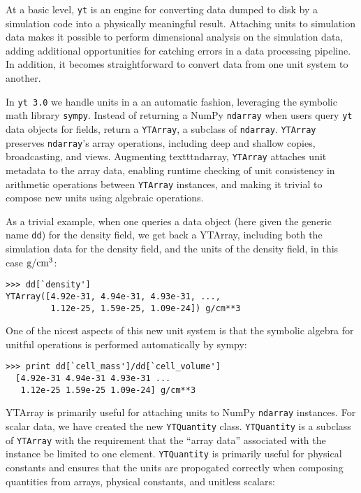 At a basic level, \texttt{yt} is an engine for converting data dumped to disk
by a simulation code into a physically meaningful result.  Attaching units to
simulation data makes it possible to perform dimensional analysis on the
simulation data, adding additional opportunities for catching errors in a data
processing pipeline.  In addition, it becomes straightforward to convert data
from one unit system to another.

In \texttt{yt 3.0} we handle units in a an automatic fashion, leveraging the
symbolic math library \texttt{sympy}. Instead of returning a NumPy
\texttt{ndarray} when users query \texttt{yt} data objects for fields, return a
\texttt{YTArray}, a subclass of \texttt{ndarray}. \texttt{YTArray} preserves
\texttt{ndarray}'s array operations, including deep and shallow copies,
broadcasting, and views.  Augmenting texttt{ndarray}, \texttt{YTArray} attaches
unit metadata to the array data, enabling runtime checking of unit consistency
in arithmetic operations between \texttt{YTArray} instances, and making it
trivial to compose new units using algebraic operations.

As a trivial example, when one queries a data object (here given the generic
name \texttt{dd}) for the density field, we get back a YTArray, including both
the simulation data for the density field, and the units of the density field,
in this case $\rm{g}/\rm{cm}^3$:

\begin{Verbatim}
>>> dd[`density'] 
YTArray([4.92e-31, 4.94e-31, 4.93e-31, ...,
         1.12e-25, 1.59e-25, 1.09e-24]) g/cm**3
\end{Verbatim}

One of the nicest aspects of this new unit system is that the symbolic
algebra for unitful operations is performed automatically by sympy:

\begin{Verbatim}
>>> print dd[`cell_mass']/dd[`cell_volume'] 
  [4.92e-31 4.94e-31 4.93e-31 ... 
   1.12e-25 1.59e-25 1.09e-24] g/cm**3
\end{Verbatim}

YTArray is primarily useful for attaching units to NumPy \texttt{ndarray}
instances. For scalar data, we have created the new \texttt{YTQuantity} class.
\texttt{YTQuantity} is a subclass of \texttt{YTArray} with the requirement that
the ``array data'' associated with the instance be limited to one
element. \texttt{YTQuantity} is primarily useful for physical constants and
ensures that the units are propogated correctly when composing quantities from
arrays, physical constants, and unitless scalars:

